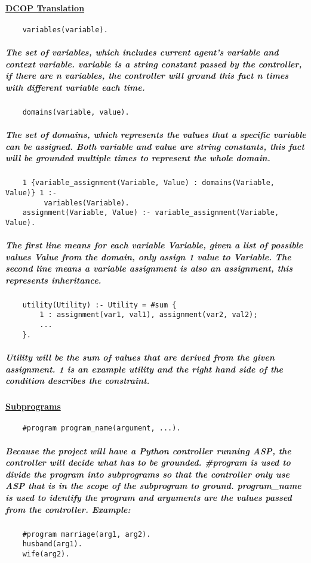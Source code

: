 \documentclass{article}
\begin{document}
	\paragraph{\underline{DCOP Translation}}
	\begin{verbatim}
	variables(variable).
	\end{verbatim}
	\subparagraph{The set of variables, which includes current agent's variable and context variable. variable is a string constant passed by the controller, if there are n variables, the controller will ground this fact n times with different variable each time.}
	\begin{verbatim}
	domains(variable, value).
	\end{verbatim}
	\subparagraph{The set of domains, which represents the values that a specific variable can be assigned. Both variable and value are string constants, this fact will be grounded multiple times to represent the whole domain.}
	\begin{verbatim}
	1 {variable_assignment(Variable, Value) : domains(Variable, Value)} 1 :- 
	     variables(Variable).
	assignment(Variable, Value) :- variable_assignment(Variable, Value).
	\end{verbatim}
	\subparagraph{The first line means for each variable Variable, given a list of possible values Value from the domain, only assign 1 value to Variable. The second line means a variable assignment is also an assignment, this represents inheritance.}
	\begin{verbatim}
	utility(Utility) :- Utility = #sum {
		1 : assignment(var1, val1), assignment(var2, val2);
		...
	}.
	\end{verbatim}
	\subparagraph{Utility will be the sum of values that are derived from the given assignment. 1 is an example utility and the right hand side of the condition describes the constraint.}
	\paragraph{\underline{Subprograms}}
	\begin{verbatim}
	#program program_name(argument, ...).
	\end{verbatim}
	\subparagraph{Because the project will have a Python controller running ASP, the controller will decide what has to be grounded. \#program is used to divide the program into subprograms so that the controller only use ASP that is in the scope of the subprogram to ground. program\_name is used to identify the program and arguments are the values passed from the controller. Example:}
	\begin{verbatim}
	#program marriage(arg1, arg2).
	husband(arg1).
	wife(arg2).
	\end{verbatim}
\end{document}
